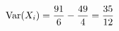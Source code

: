 \documentclass[preview]{standalone}
\begin{document}
\begin{align*}
\special{dvisvgm:raw <g id='unique000'>}\operatorname{Var}(X_i)=\frac{91}{6}-\frac{49}{4}=\frac{35}{12}\special{dvisvgm:raw </g>}
\end{align*}
\end{document}
